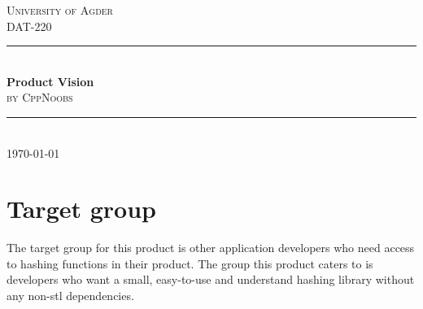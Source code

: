 \documentclass[12pt]{article}
\begin{document}
\begin{titlepage}

\newcommand{\HRule}{\rule{\linewidth}{0.5mm}} %
\center %
 
 
\textsc{\LARGE University of Agder}\\[1.5cm]
\textsc{\Large DAT-220}\\[0.5cm]

\vspace{25 mm}
\HRule \\[0.4cm]
{ \huge \bfseries Product Vision}\\[0.4cm]
\textsc{\Large by CppNoobs}\\[0.5cm]
\HRule \\[1.5cm]
 
 
 
\vspace{100 mm}
{\large \today}\\[3cm]
\vfill
\end{titlepage}



\pagestyle{fancy}
\setcounter{secnumdepth}{5}


\newpage

\section*{Target group}
The target group for this product is other application developers who need access to hashing functions in their product. The group this product caters to is developers who want a small, easy-to-use and understand hashing library without any non-stl dependencies.
\end{document}
